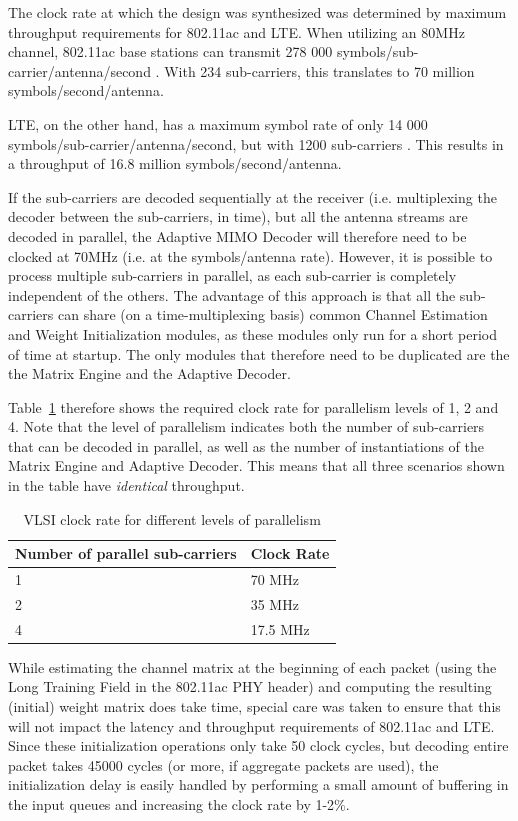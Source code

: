 \documentclass[journal]{IEEEtran}
\begin{document}
The clock rate at which the design was synthesized was determined by maximum throughput requirements for 802.11ac and LTE. When utilizing an 80MHz channel, 802.11ac base stations can transmit 278 000 symbols/sub-carrier/antenna/second \cite{802_11_ac_handbook}. With 234 sub-carriers, this translates to 70 million symbols/second/antenna.

LTE, on the other hand, has a maximum symbol rate of only 14 000 symbols/sub-carrier/antenna/second, but with 1200 sub-carriers \cite{lte_webpage}. This results in a throughput of 16.8 million symbols/second/antenna.

If the sub-carriers are decoded sequentially at the receiver (i.e. multiplexing the decoder between the sub-carriers, in time), but all the antenna streams are decoded in parallel, the Adaptive MIMO Decoder will therefore need to be clocked at 70MHz (i.e. at the symbols/antenna rate). However, it is possible to process multiple sub-carriers in parallel, as each sub-carrier is completely independent of the others. The advantage of this approach is that all the sub-carriers can share (on a time-multiplexing basis) common Channel Estimation and Weight Initialization modules, as these modules only run for a short period of time at startup. The only modules that therefore need to be duplicated are the the Matrix Engine and the Adaptive Decoder.

Table~\ref{clock_rate_table} therefore shows the required clock rate for parallelism levels of 1, 2 and 4. Note that the level of parallelism indicates both the number of sub-carriers that can be decoded in parallel, as well as the number of instantiations of the Matrix Engine and Adaptive Decoder. This means that all three scenarios shown in the table have {\em identical} throughput.

\begin{table}[!h]
\caption{VLSI clock rate for different levels of parallelism}
\label{clock_rate_table}
\centering
\begin{tabular}{l l}
\hline
Number of parallel sub-carriers & Clock Rate \\
\hline
1 & 70 MHz \\
2 & 35 MHz \\
4 & 17.5 MHz \\
\hline
\end{tabular}
\end{table}

While estimating the channel matrix at the beginning of each packet (using the Long Training Field in the 802.11ac PHY header) and computing the resulting (initial) weight matrix does take time, special care was taken to ensure that this will not impact the latency and throughput requirements of 802.11ac and LTE. Since these initialization operations only take 50 clock cycles, but decoding entire packet takes 45000 cycles (or more, if aggregate packets are used), the initialization delay is easily handled by performing a small amount of buffering in the input queues and increasing the clock rate by 1-2\%.
\end{document}
